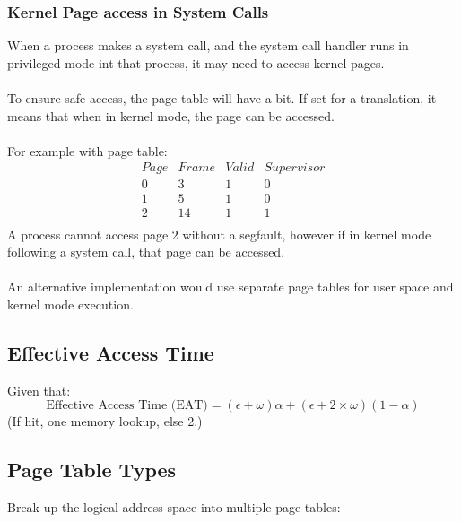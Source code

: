 \documentclass{report}
\begin{document}
            \subsubsection*{Kernel Page access in System Calls}
                When a process makes a system call, and the system call handler runs in privileged mode int that process, it may need to access kernel pages.
                \\
                \\ To ensure safe access, the page table will have a  bit. If set for a translation, it means that when in kernel mode, the page can be accessed.
                \\
                \\ For example with page table:
                \[\begin{matrix}
                    Page & Frame & Valid & Supervisor \\
                    0    & 3     & 1     & 0 \\
                    1    & 5     & 1     & 0 \\
                    2    & 14    & 1     & 1 \\
                \end{matrix}\]
                A process cannot access page $2$ without a segfault, however if in kernel mode following a system call, that page can be accessed.
                \\
                \\ An alternative implementation would use separate page tables for user space and kernel mode execution.
        
        \subsection*{Effective Access Time}
            Given that:
            \[\text{Effective Access Time (EAT)} = (\epsilon + \omega) \alpha + (\epsilon + 2 \times \omega)(1 - \alpha)\]
            (If hit, one memory lookup, else 2.)
        \\
        \subsection*{Page Table Types}
            Break up the logical address space into multiple page tables:
\end{document}
